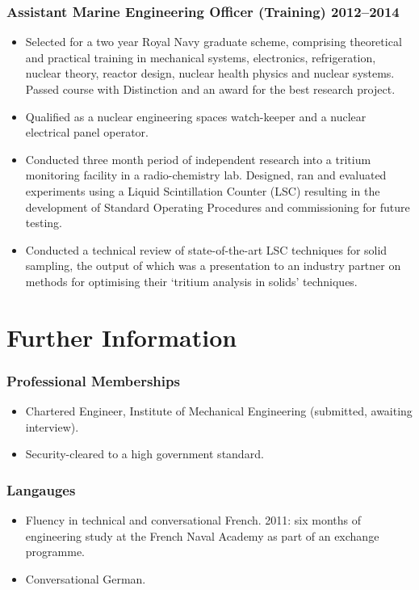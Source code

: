 \documentclass[a4paper, oneside, final, 11pt]{scrartcl} %
\begin{document}
\subsubsection*{Assistant Marine Engineering Officer (Training) \hfill 2012--2014}  
\normalfont
\begin{itemize}
	\item Selected for a two year Royal Navy graduate scheme, comprising theoretical and practical training in mechanical systems, electronics, refrigeration, nuclear theory, reactor design, nuclear health physics and nuclear systems. Passed course with Distinction and an award for the best research project. 
	\item Qualified as a nuclear engineering spaces watch-keeper and a nuclear electrical panel operator. 
	\item Conducted  three month period of independent research into a tritium monitoring facility in a radio-chemistry lab. Designed, ran and evaluated experiments using a Liquid Scintillation Counter (LSC) resulting in the development of Standard Operating Procedures and commissioning for future testing. 
	\item Conducted a technical review of state-of-the-art LSC techniques for solid sampling, the output of which was a presentation to an industry partner on methods for optimising their `tritium analysis in solids' techniques.
\end{itemize}




\section{Further Information}
\subsubsection*{Professional Memberships}

\begin{itemize}	
\item Chartered Engineer, Institute of Mechanical Engineering (submitted, awaiting interview).
\item Security-cleared to a high government standard.
\end{itemize}


\subsubsection*{Langauges}
\begin{itemize}	
\item Fluency in technical and conversational French. 2011: six months of engineering study at the French Naval Academy as part of an exchange programme. 
\item Conversational German. 
\end{itemize}
\end{document}
